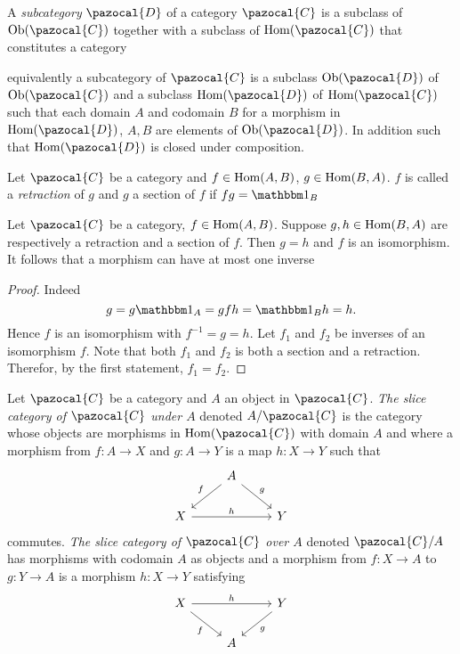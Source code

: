 \begin{definition}
    A \textit{subcategory} $\pazocal{D}$ of a category $\pazocal{C}$ is a subclass of $\Ob(\pazocal{C})$ together with a subclass of $\Hom(\pazocal{C})$ that constitutes a category
\end{definition}
\begin{remark}
    equivalently a subcategory of $\pazocal{C}$ is a subclass $\Ob(\pazocal{D})$ of $\Ob(\pazocal{C})$ and a subclass $\Hom(\pazocal{D})$ of $\Hom(\pazocal{C})$ such that each domain $A$ and codomain $B$ for a morphism in $\Hom(\pazocal{D})$, $A,B$ are elements of $\Ob(\pazocal{D})$. In addition such that $\Hom(\pazocal{D})$ is closed under composition. 
\end{remark}
\begin{definition}
    Let $\pazocal{C}$ be a category and $f\in \mathrm{Hom}(A,B)$, $g\in \mathrm{Hom}(B,A)$.  $f$ is called a \textit{retraction} of $g$ and $g$ a section of $f$ if $fg = \fone_B$   
\end{definition}
\begin{lemma}\label{AtMostOneIso}
    Let $\pazocal{C}$ be a category, $f\in \mathrm{Hom}(A,B)$. Suppose $g,h\in \mathrm{Hom}(B,A)$ are respectively a retraction and a section of $f$. Then $g=h$ and $f$ is an isomorphism. It follows that a morphism can have at most one inverse
\end{lemma}
\begin{proof}
    Indeed 
    $$g=g\fone_A = gfh=\fone_B h = h.$$
    Hence $f$ is an isomorphism with $f^{-1} = g=h$. Let $f_1$ and $f_2$ be inverses of an isomorphism $f$. Note that both $f_1$ and $f_2$ is both a section and a retraction. Therefor, by the first statement, $f_1=f_2$.   
\end{proof}
\begin{definition}
    Let $\pazocal{C}$ be a category and $A$ an object in $\pazocal{C}$. \textit{The slice category of $\pazocal{C}$ under $A$} denoted $A/\pazocal{C}$ is the category whose objects are morphisms in $\Hom(\pazocal{C})$ with domain $A$ and where a morphism from $f: A \rightarrow X$ and $g : A \rightarrow Y $ is a map $h : X\rightarrow Y$ such that 
    $$\begin{tikzcd}
       & A \arrow[ld, "f"' ] \arrow[rd, "g"]\\
        X \arrow{rr}{h} & & Y
    \end{tikzcd}$$
    commutes. \textit{The slice category of $\pazocal{C}$ over $A$} denoted $\pazocal{C}/A$ has morphisms with codomain $A$ as objects and a morphism from $f : X \rightarrow A$ to $g : Y\rightarrow A$ is a morphism $h : X \rightarrow Y$ satisfying
    $$\begin{tikzcd}
        X \arrow[rd, "f"'] \arrow[rr, "h"] & & Y\arrow[ld, "g"]\\
        & A 
    \end{tikzcd}$$
\end{definition}
